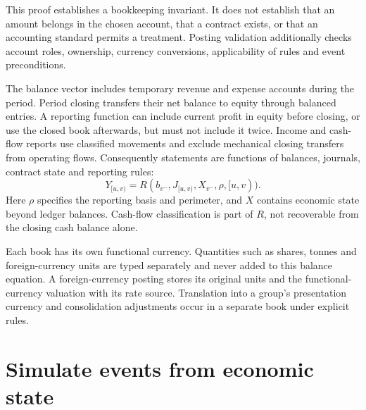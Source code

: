 This proof establishes a bookkeeping invariant. It does not establish that an
amount belongs in the chosen account, that a contract exists, or that an
accounting standard permits a treatment. Posting validation additionally
checks account roles, ownership, currency conversions, applicability of rules
and event preconditions.

The balance vector includes temporary revenue and expense accounts during
the period. Period closing transfers their net balance to equity through
balanced entries. A reporting function can include current profit in equity
before closing, or use the closed book afterwards, but must not include it
twice. Income and cash-flow reports use classified movements and exclude
mechanical closing transfers from operating flows. Consequently statements
are functions of balances, journals, contract state and reporting rules:
\begin{equation}\label{eq:report}
 Y_{[u,v)}=R(b_{v^-},J_{[u,v)},X_{v^-},\rho,[u,v)).
\end{equation}
Here $\rho$ specifies the reporting basis and perimeter, and $X$ contains
economic state beyond ledger balances. Cash-flow classification is part of
$R$, not recoverable from the closing cash balance alone.

Each book has its own functional currency. Quantities such as shares, tonnes
and foreign-currency units are typed separately and never added to this
balance equation. A foreign-currency posting stores its original units and
the functional-currency valuation with its rate source. Translation into a
group's presentation currency and consolidation adjustments occur in a
separate book under explicit rules.

\section{Simulate events from economic state}

